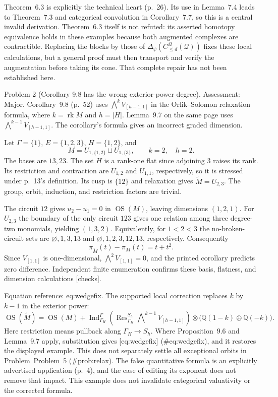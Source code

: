 \documentclass[10pt]{article}
\begin{document}
Theorem 6.3 is explicitly the technical heart (p. 26). Its use in Lemma 7.4 leads to Theorem 7.3 and categorical convolution in Corollary 7.7, so this is a central invalid derivation. Theorem 6.3 itself is not refuted: its asserted homotopy equivalence holds in these examples because both augmented complexes are contractible. Replacing the blocks by those of \(\Delta_\psi(C_{\leq d}^\Omega(\mathcal Q))\) fixes these local calculations, but a general proof must then transport and verify the augmentation before taking its cone. That complete repair has not been established here.\par
Problem 2 (Corollary 9.8 has the wrong exterior-power degree).  Assessment: Major. Corollary 9.8 (p. 52) uses \(\bigwedge^k V_{[h-1,1]}\) in the Orlik–Solomon relaxation formula, where \(k=\operatorname{rk}M\) and \(h=|H|\). Lemma 9.7 on the same page uses \(\bigwedge^{k-1}V_{[h-1,1]}\). The corollary’s formula gives an incorrect graded dimension.\par
Let \(\Gamma=\{1\}\), \(E=\{1,2,3\}\), \(H=\{1,2\}\), and \[M=U_{1,\{1,2\}}\sqcup U_{1,\{3\}},\qquad k=2,\quad h=2.\] The bases are \(13,23\). The set \(H\) is a rank-one flat since adjoining \(3\) raises its rank. Its restriction and contraction are \(U_{1,2}\) and \(U_{1,1}\), respectively, so it is stressed under p. 13’s definition. Its cusp is \(\{12\}\) and relaxation gives \(\widetilde M=U_{2,3}\). The group, orbit, induction, and restriction factors are trivial.\par
The circuit \(12\) gives \(u_2-u_1=0\) in \(\operatorname{OS}(M)\), leaving dimensions \((1,2,1)\). For \(U_{2,3}\) the boundary of the only circuit \(123\) gives one relation among three degree-two monomials, yielding \((1,3,2)\). Equivalently, for \(1<2<3\) the no-broken-circuit sets are \(\varnothing,1,3,13\) and \(\varnothing,1,2,3,12,13\), respectively. Consequently \[\pi_{\widetilde M}(t)-\pi_M(t)=t+t^2.\] Since \(V_{[1,1]}\) is one-dimensional, \(\bigwedge^2V_{[1,1]}=0\), and the printed corollary predicts zero difference. Independent finite enumeration confirms these basis, flatness, and dimension calculations [checks].\par
Equation reference: eq:wedgefix. The supported local correction replaces \(k\) by \(k-1\) in the exterior power: \[
 \operatorname{OS}(\widetilde M)=\operatorname{OS}(M)+
 \operatorname{Ind}_{\Gamma_H}^{\Gamma}
 \left(\operatorname{Res}_{\Gamma_H}^{S_h}\bigwedge\nolimits^{k-1}V_{[h-1,1]}\right)
 \otimes\bigl(\mathbb Q(1-k)\oplus\mathbb Q(-k)\bigr).\] Here restriction means pullback along \(\Gamma_H\to S_h\). Where Proposition 9.6 and Lemma 9.7 apply, substitution gives [eq:wedgefix] (\#eq:wedgefix), and it restores the displayed example. This does not separately settle all exceptional orbits in Problem Problem 5 (\#prob:relax). The false quantitative formula is an explicitly advertised application (p. 4), and the ease of editing its exponent does not remove that impact. This example does not invalidate categorical valuativity or the corrected formula.\par
\end{document}
